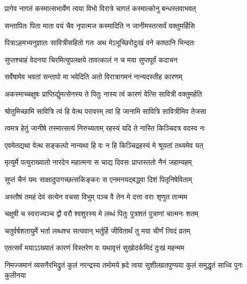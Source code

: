 \begin{center}
\twolineshloka
{प्रागेव नागतं कस्मात्सभार्येण त्वया विभो}
{विरात्रे चागतं कस्मात्कोनु बन्धस्तवाभवत्}


\twolineshloka
{सन्तापितः पिता माता वयं चैव नृपात्मज}
{कस्मादिति न जानीमस्तत्सर्वं वक्तुमर्हिसि}




\twolineshloka
{पित्राऽहमभ्यनुज्ञातः सावित्रीसहितो गतः}
{अथ मेऽभूच्छिरोदुःखं वने काष्ठानि भिन्दतः}


\twolineshloka
{सुप्तश्चाहं वेदनया चिरमित्युपलक्षये}
{तावत्कालं न च मया सुप्तपूर्वं कदाचन}


\twolineshloka
{सर्वेषामेव भवतां सन्तापो मा भवेदिति}
{अतो विरात्रागमनं नान्यदस्तीह कारणम्}




\twolineshloka
{अकस्माच्चक्षुषः प्राप्तिर्द्युमत्सेनस्य ते पितुः}
{नास्य त्वं कारणं वेत्सि सावित्री वक्तुमर्हति}


\twolineshloka
{श्रोतुमिच्छामि सावित्रि त्वं हि वेत्थ परावरम्}
{त्वां हि जानामि सावित्रि सावित्रीमिव तेजसा}


\twolineshloka
{त्वमत्र हेतुं जानीषे तस्मात्सत्यं निरुच्यताम्}
{रहस्यं यदि ते नास्ति किञ्चिदत्र वदस्व नः}




\twolineshloka
{एवमेतद्यथा वेत्थ सङ्कल्पो नान्यथा हि वः}
{न हि किञ्चिद्रहस्यं मे श्रूयतां तथ्यमेव यत्}


\twolineshloka
{मृत्युर्मे पत्युराख्यातो नारदेन महात्मना}
{स चाद्य दिवसः प्राप्तस्ततो नैनं जहाम्यहम्}


\twolineshloka
{सुप्तं चैनं यमः साक्षादुपागच्छत्सकिङ्करः}
{स एनमनयद्बद्ध्वा दिशं पितृनिषेविताम्}


\twolineshloka
{अस्तौषं तमहं देवं सत्येन वचसा विभुम्}
{पञ्च वै तेन मे दत्ता वराः शृणुत तान्मम}


\twolineshloka
{चक्षुषी च स्वराज्यञ्च द्वौ वरौ श्वशुरस्य मे}
{लब्धं पितुः पुत्रशतं पुत्राणां चात्मनः शतम्}


\twolineshloka
{चतुर्वर्षशतायुर्मे भर्ता लब्धश्च सत्यवान्}
{भर्तुर्हि जीवितार्थं तु मया चीर्णं त्विदं व्रतम्}



\twolineshloka
{एतत्सर्वं मयाऽऽख्यातं कारणं विस्तरेण वः}
{यथावृत्तं सुखोदर्कमिदं दुःखं महन्मम}




\fourlineindentedshloka
{निमज्जमानं व्यसनैरभिद्रुतं}
{कुलं नरन्द्रस्य तमोमये ह्रदे}
{त्वया सुशीलव्रतपुण्यया कुलं}
{समुद्धृतं साध्वि पुनः कुलीनया}


\end{center}
